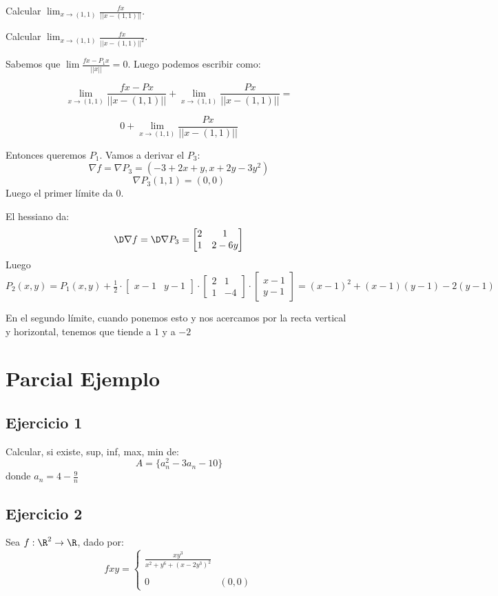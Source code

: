\documentclass{article}
\begin{document}
Calcular $\lim_{x \to (1,1)} \frac{fx}{||x - (1,1)||}$.

Calcular $\lim_{x \to (1,1)} \frac{fx}{||x - (1,1)||^2}$.

Sabemos que $\lim \frac{fx - P_1x}{||x||} = 0$. Luego podemos escribir como:

\[
	\lim_{x \to (1,1)} \frac{fx - Px}{||x - (1,1)||} + 
	\lim_{x \to (1,1)} \frac{Px}{||x - (1,1)||} =
\]

\[
	0 + \lim_{x \to (1,1)} \frac{Px}{||x - (1,1)||}
\]

Entonces queremos $P_1$. Vamos a derivar el $P_3$:
\[
	\nabla f = \nabla P_3 = (-3 +2x+y, x+2y-3y^2)
\]
\[
	\nabla P_3 (1,1) = (0, 0)
\]
Luego el primer límite da $0$.

El hessiano da:
\[
	\D \nabla f = \D \nabla P_3 =
	\begin{bmatrix}
		2 & 1 \\
		1 & 2 - 6y
	\end{bmatrix}
\]
Luego $P_2 (x,y) = P_1(x,y) + \frac{1}{2} \cdot
\begin{bmatrix}
	x-1 & y-1
\end{bmatrix} \cdot
\begin{bmatrix}
		2 & 1 \\
		1 & -4 
\end{bmatrix} \cdot 
\begin{bmatrix}
	x-1 \\ y-1
\end{bmatrix} = (x-1)^2 + (x-1)(y-1) -2(y -1)$

En el segundo límite, cuando ponemos esto y nos acercamos por la recta vertical y horizontal, tenemos que tiende a $1$ y a $-2$

\section*{Parcial Ejemplo}
\subsection*{Ejercicio 1}
Calcular, si existe, sup, inf, max, min de:
\[
	A = \{ a^2_n - 3a_n - 10 \}
\]
donde $a_n = 4 - \frac{9}{n}$

\subsection*{Ejercicio 2}
Sea $f : \R^2 \to \R$, dado por:
\[
	f xy= 
	\begin{cases}
		\frac{xy^3}{x^2 + y^6 + (x-2y^3)^2} \\
		\\
		0 & (0, 0)
	\end{cases}
\]
\end{document}
